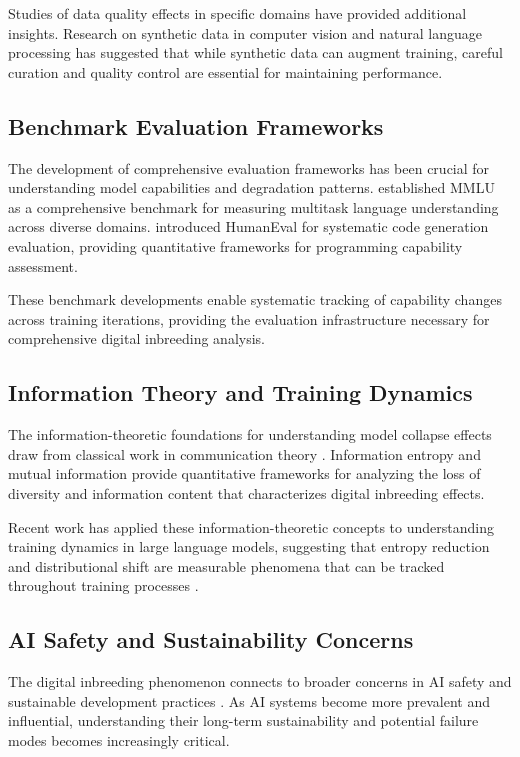 \documentclass[11pt]{article}
\begin{document}
Studies of data quality effects in specific domains have provided additional insights. Research on synthetic data in computer vision \citep{borji2022pros} and natural language processing has suggested that while synthetic data can augment training, careful curation and quality control are essential for maintaining performance.

\subsection{Benchmark Evaluation Frameworks}

The development of comprehensive evaluation frameworks has been crucial for understanding model capabilities and degradation patterns. \citet{hendrycks2020measuring} established MMLU as a comprehensive benchmark for measuring multitask language understanding across diverse domains. \citet{chen2021evaluating} introduced HumanEval for systematic code generation evaluation, providing quantitative frameworks for programming capability assessment.

These benchmark developments enable systematic tracking of capability changes across training iterations, providing the evaluation infrastructure necessary for comprehensive digital inbreeding analysis.

\subsection{Information Theory and Training Dynamics}

The information-theoretic foundations for understanding model collapse effects draw from classical work in communication theory \citep{shannon1948mathematical, cover1999elements}. Information entropy and mutual information provide quantitative frameworks for analyzing the loss of diversity and information content that characterizes digital inbreeding effects.

Recent work has applied these information-theoretic concepts to understanding training dynamics in large language models, suggesting that entropy reduction and distributional shift are measurable phenomena that can be tracked throughout training processes \citep{hoffmann2022training}.

\subsection{AI Safety and Sustainability Concerns}

The digital inbreeding phenomenon connects to broader concerns in AI safety and sustainable development practices \citep{amodei2016concrete, russell2019human}. As AI systems become more prevalent and influential, understanding their long-term sustainability and potential failure modes becomes increasingly critical.
\end{document}
